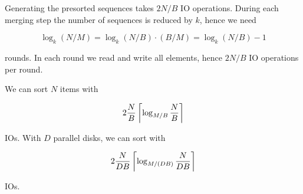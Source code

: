 Generating the presorted sequences takes $2N/B$ IO operations. During each merging step the number of sequences is reduced by $k$, hence we need

\[\log_k(N/M) = \log_k(N/B)\cdot (B/M) = \log_k(N/B) - 1\]

rounds. In each round we read and write all elements, hence $2N/B$ IO operations per round.

\begin{thm} We can sort $N$ items with 

\[2\frac NB \left\lceil \log_{M/B} \frac NB \right\rceil\]

IOs. With $D$ parallel disks, we can sort with

\[2\frac{N}{DB}\left\lceil \log_{M/(DB)} \frac{N}{DB} \right\rceil\]

IOs.
\end{thm}